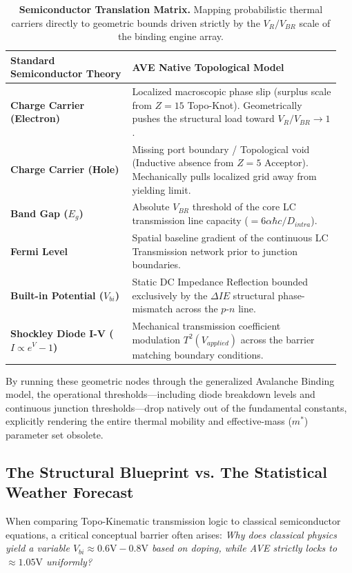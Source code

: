 \begin{table}[ht]
\centering
\begin{tabular}{|p{0.35\linewidth} | p{0.6\linewidth}|}
\hline
\textbf{Standard Semiconductor Theory} & \textbf{AVE Native Topological Model} \\
\hline
\textbf{Charge Carrier (Electron)} & Localized macroscopic phase slip (surplus scale from $Z=15$ Topo-Knot). Geometrically pushes the structural load toward $V_R / V_{BR} \to 1$. \\
\hline
\textbf{Charge Carrier (Hole)} & Missing port boundary / Topological void (Inductive absence from $Z=5$ Acceptor). Mechanically pulls localized grid away from yielding limit. \\
\hline
\textbf{Band Gap ($E_g$)} & Absolute $V_{BR}$ threshold of the core LC transmission line capacity ($= 6\alpha\hbar c / D_{intra}$). \\
\hline
\textbf{Fermi Level} & Spatial baseline gradient of the continuous LC Transmission network prior to junction boundaries. \\
\hline
\textbf{Built-in Potential ($V_{bi}$)} & Static DC Impedance Reflection bounded exclusively by the $\Delta IE$ structural phase-mismatch across the $p$-$n$ line. \\
\hline
\textbf{Shockley Diode I-V ($I \propto e^V - 1$)} & Mechanical transmission coefficient modulation $T^2(V_{applied})$ across the barrier matching boundary conditions. \\
\hline
\end{tabular}
\caption{\textbf{Semiconductor Translation Matrix.} Mapping probabilistic thermal carriers directly to geometric bounds driven strictly by the $V_R / V_{BR}$ scale of the binding engine array.}
\label{table:doping_translation}
\end{table}

By running these geometric nodes through the generalized Avalanche Binding model, the operational thresholds---including diode breakdown levels and continuous junction thresholds---drop natively out of the fundamental constants, explicitly rendering the entire thermal mobility and effective-mass ($m^*$) parameter set obsolete.

\subsection{The Structural Blueprint vs. The Statistical Weather Forecast}
When comparing Topo-Kinematic transmission logic to classical semiconductor equations, a critical conceptual barrier often arises: \textit{Why does classical physics yield a variable $V_{bi} \approx 0.6\text{V} - 0.8\text{V}$ based on doping, while AVE strictly locks to $\approx 1.05\text{V}$ uniformly?}

